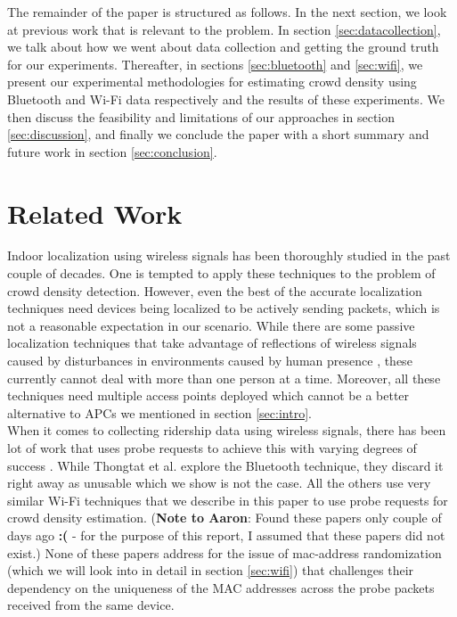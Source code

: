 The remainder of the paper is structured as follows. In the next section, we look at previous work that is relevant to the problem. In section \ref{sec:datacollection}, we talk about how we went about data collection and getting the ground truth for our experiments. Thereafter, in sections \ref{sec:bluetooth} and \ref{sec:wifi}, we present our experimental methodologies for estimating crowd density using Bluetooth and Wi-Fi data respectively and the results of these experiments. We then discuss the feasibility and limitations of our approaches in section \ref{sec:discussion}, and finally we conclude the paper with a short summary and future work in section \ref{sec:conclusion}. \\


\section{Related Work}
Indoor localization using wireless signals has been thoroughly studied in the past couple of decades. One is tempted to apply these techniques to the problem of crowd density detection. However, even the best of the accurate localization techniques \cite{ActiveLoc01} need devices being localized to be actively sending packets, which is not a reasonable expectation in our scenario. While there are some passive localization techniques that take advantage of reflections of wireless signals caused by disturbances in environments caused by human presence \cite{PassiveLoc01}, these currently cannot deal with more than one person at a time. Moreover, all these techniques need multiple access points deployed which cannot be a better alternative to APCs we mentioned in section \ref{sec:intro}. \\

When it comes to collecting ridership data using wireless signals, there has been lot of work that uses probe requests to achieve this with varying degrees of success \cite{BusCrowd01, BusCrowd02, BusCrowd03, BusCrowd04}. While Thongtat et al. \cite{BusCrowd01} explore the Bluetooth technique, they discard it right away as unusable which we show is not the case. All the others use very similar Wi-Fi techniques that we describe in this paper to use probe requests for crowd density estimation. (\textbf{Note to Aaron}: Found these papers only couple of days ago \textbf{:(} - for the purpose of this report, I assumed that these papers did not exist.) None of these papers address for the issue of mac-address randomization (which we will look into in detail in section \ref{sec:wifi}) that challenges their dependency on the uniqueness of the MAC addresses across the probe packets received from the same device. 


